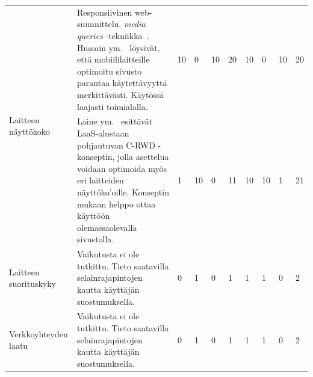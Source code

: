 \documentclass[finnish, 12pt, a4paper, elec, utf8, a-1b, online]{aaltothesis}
\begin{document}
{\begin{longtable}{p{2.5cm}|p{6cm}|p{0.5cm}p{0.5cm}p{0.5cm}|p{0.5cm}|p{0.5cm}p{0.5cm}p{0.5cm}|p{0.5cm}|}
    \midrule
    \multirow[t]{2}{*}{Laitteen näyttökoko} & Responsiivinen web-suunnittelu, \textit{media queries} -tekniikka~\cite{Rivoal:12:MQ}. Hussain ym.~\cite{WOS:000218608600006} löysivät, että mobiililaitteille optimoitu sivusto parantaa käytettävyyttä merkittävästi. Käytössä laajasti toimialalla.                                                                                                          & 10                                         & 0                                   & 10                                     & 20                           & 10                                              & 0                                         & 10                                        & 20                           \\\cline{2-10}
                                            & Laine ym.~\cite{laine2021responsive} esittävät LaaS-alustaan pohjautuvan C-RWD -konseptin, jolla asettelua voidaan optimoida myös eri laitteiden näyttöko'oille. Konseptin mukaan helppo ottaa käyttöön olemassaolevalla sivustolla.                                                                                              & 1                                          & 10                                  & 0                                      & 11                           & 10                                              & 10                                        & 1                                         & 21                           \\
    \midrule
    Laitteen suorituskyky                   & Vaikutusta ei ole tutkittu. Tieto saatavilla selainrajapintojen kautta käyttäjän suostumuksella.                                                                                                                                                                                                                                  & 0                                          & 1                                   & 0                                      & 1                            & 1                                               & 1                                         & 0                                         & 2                            \\
    \midrule
    Verkkoyhteyden laatu                    & Vaikutusta ei ole tutkittu. Tieto saatavilla selainrajapintojen kautta käyttäjän suostumuksella.                                                                                                                                                                                                                                  & 0                                          & 1                                   & 0                                      & 1                            & 1                                               & 1                                         & 0                                         & 2                            \\

\end{longtable}}
\end{document}
